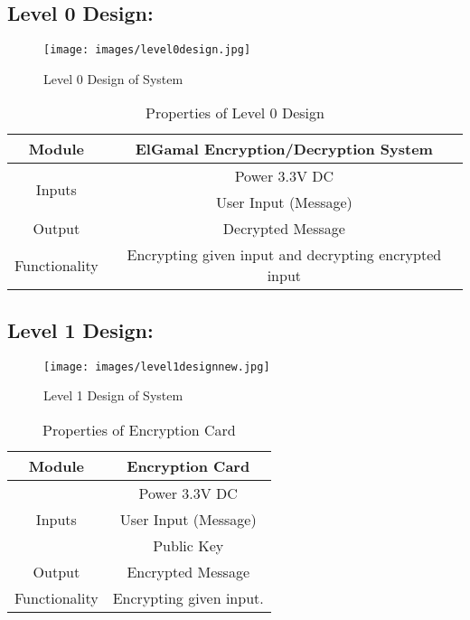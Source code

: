 \documentclass[12pt]{article}
\begin{document}
	\subsection{Level 0 Design:}
	\begin{figure}[H]
		\centering
		\label{Level 0 Design of System }
		\texttt{[image: images/level0design.jpg]}\\[0.5 cm]	
		\caption{Level 0 Design of System } 		
	\end{figure}
	\begin{table}[H]
		\centering
		
		\label{Properties Of Level 0 Design }
		\begin{tabular}{|c|c|}
			\hline
			Module & ElGamal Encryption/Decryption System \\ \hline
			\multirow{2}{*}{Inputs} & Power 3.3V DC \\ \cline{2-2}
			& User Input (Message) \\ \hline
			Output & Decrypted Message \\ \hline
			Functionality & Encrypting given input and  decrypting encrypted input \\ \hline
		
		\end{tabular}
		\caption{Properties of Level 0 Design }
	\end{table}
	
	\subsection{Level 1 Design:}

	\begin{figure}[H]
		\centering
		\label{Level 1 Design of System }
		\texttt{[image: images/level1designnew.jpg]}\\[0.5 cm]	
		\caption{Level 1 Design of System } 		
	\end{figure}
	

\begin{table}[h]

	\centering
	
	\label{Properties of Encryption Card}
	\begin{tabular}{|c|c|}
		\hline
		Module & Encryption Card \\ \hline
		\multirow{3}{*}{Inputs} & Power 3.3V DC \\
		\cline{2-2}
		& User Input (Message) \\
		\cline{2-2}
		& Public Key \\ \hline
		Output & Encrypted Message \\ \hline
		Functionality & Encrypting given input.\\ \hline		
	\end{tabular}
	\caption{Properties of Encryption Card}

\end{table}
\end{document}
